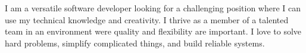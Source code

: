 
\begin{cvparagraph}
I am a versatile software developer looking for a challenging position where I
can use my technical knowledge and creativity. I thrive as a member of a
talented team in an environment were quality and flexibility are important. I
love to solve hard problems, simplify complicated things, and build reliable
systems.
\end{cvparagraph}
